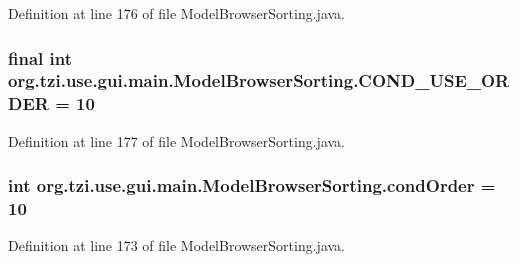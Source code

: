 Definition at line 176 of file Model\-Browser\-Sorting.\-java.

\hypertarget{classorg_1_1tzi_1_1use_1_1gui_1_1main_1_1_model_browser_sorting_a6443961964138b18d218c6b949cacd53}{
\subsubsection[{C\-O\-N\-D\-\_\-\-U\-S\-E\-\_\-\-O\-R\-D\-E\-R}]{\setlength{\rightskip}{0pt plus 5cm}final int org.\-tzi.\-use.\-gui.\-main.\-Model\-Browser\-Sorting.\-C\-O\-N\-D\-\_\-\-U\-S\-E\-\_\-\-O\-R\-D\-E\-R = 10\hspace{0.3cm}{\ttfamily [static]}}}\label{classorg_1_1tzi_1_1use_1_1gui_1_1main_1_1_model_browser_sorting_a6443961964138b18d218c6b949cacd53}


Definition at line 177 of file Model\-Browser\-Sorting.\-java.

\hypertarget{classorg_1_1tzi_1_1use_1_1gui_1_1main_1_1_model_browser_sorting_a66e5ecacf2e48e5e7e379c368117ae27}{
\subsubsection[{cond\-Order}]{\setlength{\rightskip}{0pt plus 5cm}int org.\-tzi.\-use.\-gui.\-main.\-Model\-Browser\-Sorting.\-cond\-Order = 10}}\label{classorg_1_1tzi_1_1use_1_1gui_1_1main_1_1_model_browser_sorting_a66e5ecacf2e48e5e7e379c368117ae27}


Definition at line 173 of file Model\-Browser\-Sorting.\-java.

